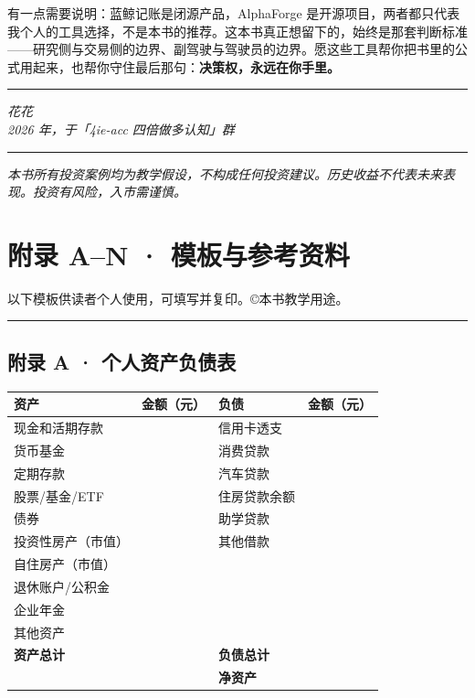 \documentclass[a4paper,11pt,oneside,fontset=none,UTF8,zihao=-4]{ctexbook}
\begin{document}
有一点需要说明：蓝鲸记账是闭源产品，AlphaForge
是开源项目，两者都只代表我个人的工具选择，不是本书的推荐。这本书真正想留下的，始终是那套判断标准------研究侧与交易侧的边界、副驾驶与驾驶员的边界。愿这些工具帮你把书里的公式用起来，也帮你守住最后那句：\textbf{决策权，永远在你手里。}

\begin{center}{\color{dh-bronze}\rule{0.2\textwidth}{0.5pt}}\end{center}

\emph{花花}\\
\emph{2026 年，于「4i️e-acc 四倍做多认知」群}

\begin{center}{\color{dh-bronze}\rule{0.2\textwidth}{0.5pt}}\end{center}

\emph{本书所有投资案例均为教学假设，不构成任何投资建议。历史收益不代表未来表现。投资有风险，入市需谨慎。}

\backmatter

\newpage

\chapter{附录 A--N ·
模板与参考资料}\label{ux9644ux5f55-an-ux6a21ux677fux4e0eux53c2ux8003ux8d44ux6599}

\begin{dhquote}
以下模板供读者个人使用，可填写并复印。©本书教学用途。
\end{dhquote}

\begin{center}{\color{dh-bronze}\rule{0.2\textwidth}{0.5pt}}\end{center}

\section{附录 A ·
个人资产负债表}\label{ux9644ux5f55-a-ux4e2aux4ebaux8d44ux4ea7ux8d1fux503aux8868}

\begin{longtable}[]{@{}llll@{}}
\toprule\noalign{}\rowcolor{dh-pink!25}
资产 & 金额（元） & 负债 & 金额（元） \\
\midrule\noalign{}
\endhead
\bottomrule\noalign{}
\endlastfoot
现金和活期存款 & & 信用卡透支 & \\
货币基金 & & 消费贷款 & \\
定期存款 & & 汽车贷款 & \\
股票/基金/ETF & & 住房贷款余额 & \\
债券 & & 助学贷款 & \\
投资性房产（市值） & & 其他借款 & \\
自住房产（市值） & & & \\
退休账户/公积金 & & & \\
企业年金 & & & \\
其他资产 & & & \\
\textbf{资产总计} & & \textbf{负债总计} & \\
& & \textbf{净资产} & \\
\end{longtable}
\end{document}
